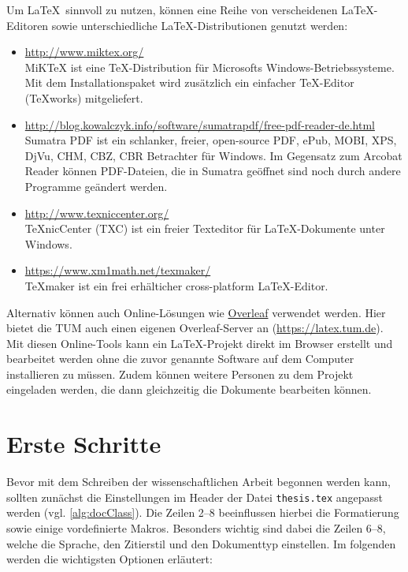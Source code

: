 Um \LaTeX\ sinnvoll zu nutzen, können eine Reihe von verscheidenen \LaTeX-Editoren sowie unterschiedliche \LaTeX-Distributionen genutzt werden:
\begin{itemize}
	\item \href{http://www.miktex.org/}{http://www.miktex.org/}\\
	MiKTeX ist eine TeX-Distribution für Microsofts Windows-Betriebssysteme. Mit dem Installationspaket wird zusätzlich ein einfacher TeX-Editor (TeXworks) mitgeliefert.
	\item \href{http://blog.kowalczyk.info/software/sumatrapdf/free-pdf-reader-de.html}{http://blog.kowalczyk.info/software/sumatrapdf/free-pdf-reader-de.html}\\
	Sumatra PDF ist ein schlanker, freier, open-source PDF, ePub, MOBI, XPS, DjVu, CHM, CBZ, CBR Betrachter für Windows.	Im Gegensatz zum Arcobat Reader können PDF-Dateien, die in Sumatra geöffnet sind noch durch andere Programme geändert werden.
	\item \href{http://www.texniccenter.org/}{http://www.texniccenter.org/}\\
	TeXnicCenter (TXC) ist ein freier Texteditor für LaTeX-Dokumente unter Windows.
	\item \href{https://www.xm1math.net/texmaker/}{https://www.xm1math.net/texmaker/}\\
	TeXmaker ist ein frei erhälticher cross-platform LaTeX-Editor.
\end{itemize}

Alternativ können auch Online-Lösungen wie \glqq{}\href{https://www.overleaf.com/}{Overleaf}\grqq{} verwendet werden. 
Hier bietet die TUM auch einen eigenen Overleaf-Server an (\href{https://latex.tum.de}{https://latex.tum.de}).
Mit diesen Online-Tools kann ein \LaTeX-Projekt direkt im Browser erstellt und bearbeitet werden ohne die zuvor genannte Software auf dem Computer installieren zu müssen. 
Zudem können weitere Personen zu dem Projekt eingeladen werden, die dann gleichzeitig die Dokumente bearbeiten können.

\section{Erste Schritte}
\label{sec:ersteschritte}

Bevor mit dem Schreiben der wissenschaftlichen Arbeit begonnen werden kann, sollten zunächst die Einstellungen im Header der Datei \texttt{thesis.tex} angepasst werden (vgl. \cref{alg:docClass}). 
Die Zeilen 2--8 beeinflussen hierbei die Formatierung sowie einige vordefinierte Makros. 
Besonders wichtig sind dabei die Zeilen 6--8, welche die Sprache, den Zitierstil und den Dokumenttyp einstellen. 
Im folgenden werden die wichtigsten Optionen erläutert:

